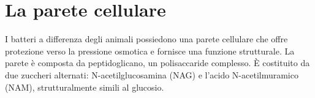 \chapter{La parete cellulare}
I batteri a differenza degli animali possiedono una parete cellulare che offre protezione verso la pressione osmotica e fornisce una funzione strutturale. La
parete \`e composta da peptidoglicano, un polisaccaride complesso. \`E costituito da due zuccheri alternati: N-acetilglucosamina (NAG) e l'acido 
N-acetilmuramico (NAM), strutturalmente simili al glucosio.
\setcrambond{2pt}{}{}